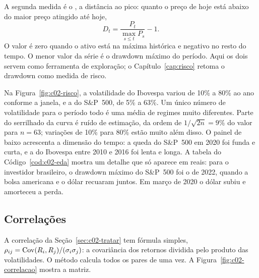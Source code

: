 A segunda medida é o , a distância ao pico: quanto o preço de hoje está abaixo do maior preço atingido até hoje,
\begin{equation}
  D_t = \frac{P_t}{\max_{s \le t} P_s} - 1 .
  \label{eq:c02-queda}
\end{equation}
O valor é zero quando o ativo está na máxima histórica e negativo no resto do tempo. O menor valor da série é o drawdown máximo do período. Aqui os dois servem como ferramenta de exploração; o Capítulo~\ref{cap:risco} retoma o drawdown como medida de risco.


Na Figura~\ref{fig:c02-risco}, a volatilidade do Ibovespa variou de 10\% a 80\% ao ano conforme a janela, e a do S\&P~500, de 5\% a 63\%. Um único número de volatilidade para o período todo é uma média de regimes muito diferentes. Parte do serrilhado da curva é ruído de estimação, da ordem de $1/\sqrt{2n} = 9\%$ do valor para $n = 63$; variações de 10\% para 80\% estão muito além disso. O painel de baixo acrescenta a dimensão do tempo: a queda do S\&P~500 em 2020 foi funda e curta, e a do Ibovespa entre 2010 e 2016 foi lenta e longa. A tabela do Código~\ref{cod:c02-eda} mostra um detalhe que só aparece em reais: para o investidor brasileiro, o drawdown máximo do S\&P~500 foi o de 2022, quando a bolsa americana e o dólar recuaram juntos. Em março de 2020 o dólar subiu e amorteceu a perda.

\subsection{Correlações}

A correlação da Seção~\ref{sec:c02-tratar} tem fórmula simples, $\rho_{ij} = \operatorname{Cov}(R_i, R_j) / (\sigma_i \sigma_j)$: a covariância dos retornos dividida pelo produto das volatilidades. O método  calcula todos os pares de uma vez. A Figura~\ref{fig:c02-correlacao} mostra a matriz.


